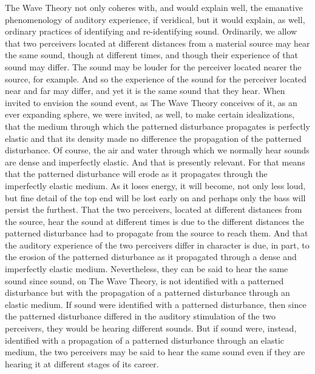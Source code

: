 The Wave Theory not only coheres with, and would explain well, the emanative phenomenology of auditory experience, if veridical, but it would explain, as well, ordinary practices of identifying and re-identifying sound. Ordinarily, we allow that two perceivers located at different distances from a material source may hear the same sound, though at different times, and though their experience of that sound may differ. The sound may be louder for the perceiver located nearer the source, for example. And so the experience of the sound for the perceiver located near and far may differ, and yet it is the same sound that they hear. When invited to envision the sound event, as The Wave Theory conceives of it, as an ever expanding sphere, we were invited, as well, to make certain idealizations, that the medium through which the patterned disturbance propagates is perfectly elastic and that its density made no difference the propagation of the patterned disturbance. Of course, the air and water through which we normally hear sounds are dense and imperfectly elastic. And that is presently relevant. For that means that the patterned disturbance will erode as it propagates through the imperfectly elastic medium. As it loses energy, it will become, not only less loud, but fine detail of the top end will be lost early on and perhaps only the bass will persist the furthest. That the two perceivers, located at different distances from the source, hear the sound at different times is due to the different distances the patterned disturbance had to propagate from the source to reach them. And that the auditory experience of the two perceivers differ in character is due, in part, to the erosion of the patterned disturbance as it propagated through a dense and imperfectly elastic medium. Nevertheless, they can be said to hear the same sound since sound, on The Wave Theory, is not identified with a patterned disturbance but with the propagation of a patterned disturbance through an elastic medium. If sound were identified with a patterned disturbance, then since the patterned disturbance differed in the auditory stimulation of the two perceivers, they would be hearing different sounds. But if sound were, instead, identified with a propagation of a patterned disturbance through an elastic medium, the two perceivers may be said to hear the same sound even if they are hearing it at different stages of its career.


